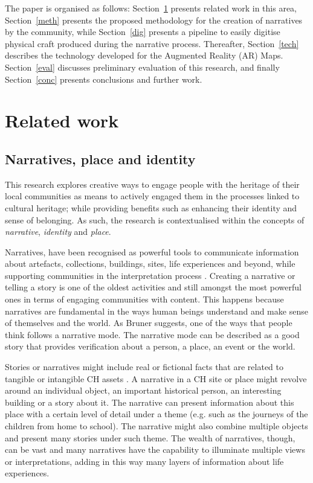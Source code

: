 \documentclass[acmlarge,screen,dvipsnames]{acmart}
\begin{document}
The paper is organised as follows: Section~\ref{ref} presents related
work in this area, Section~\ref{meth} presents the proposed methodology for
the creation of narratives by the community,
while Section~\ref{dig} presents a pipeline to easily digitise physical
craft produced during the narrative process. Thereafter,
Section~\ref{tech} describes the technology developed for the Augmented
Reality (AR) Maps. Section~\ref{eval} discusses preliminary evaluation
of this research, and finally Section~\ref{conc} presents conclusions
and further work.
\color{black}


\section{Related work} 
\label{ref}
\color{blue}

\subsection{Narratives, place and identity}
This research explores creative ways to engage people with the heritage of their local communities as means to actively engaged them in the processes linked to cultural heritage; while providing benefits such as enhancing their identity and sense of belonging. As such, the research is contextualised within the concepts of \emph{narrative}, \emph{identity} and \emph{place}.

Narratives, have been recognised as powerful tools to communicate information about artefacts, collections, buildings, sites, life experiences and beyond, while supporting communities in the interpretation process \cite{Kelly2010,Pine2007}. Creating a narrative or telling a story is one of the oldest activities and still amongst the most powerful ones in terms of engaging communities with content. This happens because narratives are fundamental in the ways human beings understand and make sense of themselves and the world. As Bruner \cite{Bruner1986} suggests, one of the ways that people think follows a narrative mode. The narrative mode can be described as a good story that provides verification about a person, a place, an event or the world.

Stories or narratives might include real or fictional facts that are related to tangible or intangible CH assets \cite{HandlerMiller2004}. A narrative in a CH site or place might revolve around an individual object, an important historical person, an interesting building or a story about it. The narrative can present information about this place with a certain level of detail under a theme (e.g. such as the journeys of the children from home to school). The narrative might also combine multiple objects and present many stories under such theme. The wealth of narratives, though, can be vast and many narratives have the capability to illuminate multiple views or interpretations, adding in this way many layers of information about life experiences.
\end{document}

